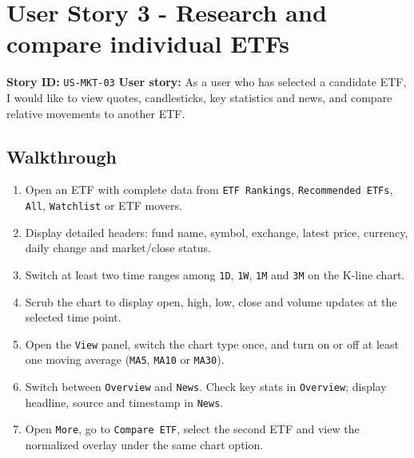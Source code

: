\section{User Story 3 - Research and compare individual ETFs}
\textbf{Story ID:} \texttt{US-MKT-03}
\textbf{User story:} As a user who has selected a candidate ETF, I would like to view quotes, candlesticks, key statistics and news, and compare relative movements to another ETF.
\subsection{Walkthrough}
\begin{enumerate}
\item Open an ETF with complete data from \texttt{ETF Rankings}, \texttt{Recommended ETFs}, \texttt{All}, \texttt{Watchlist} or ETF movers.
\item Display detailed headers: fund name, symbol, exchange, latest price, currency, daily change and market/\allowbreak{}close status.
\item Switch at least two time ranges among \texttt{1D}, \texttt{1W}, \texttt{1M} and \texttt{3M} on the K-line chart.
\item Scrub the chart to display open, high, low, close and volume updates at the selected time point.
\item Open the \texttt{View} panel, switch the chart type once, and turn on or off at least one moving average (\texttt{MA5}, \texttt{MA10} or \texttt{MA30}).
\item Switch between \texttt{Overview} and \texttt{News}. Check key stats in \texttt{Overview}; display headline, source and timestamp in \texttt{News}.
\item Open \texttt{More}, go to \texttt{Compare ETF}, select the second ETF and view the normalized overlay under the same chart option.
\end{enumerate}

